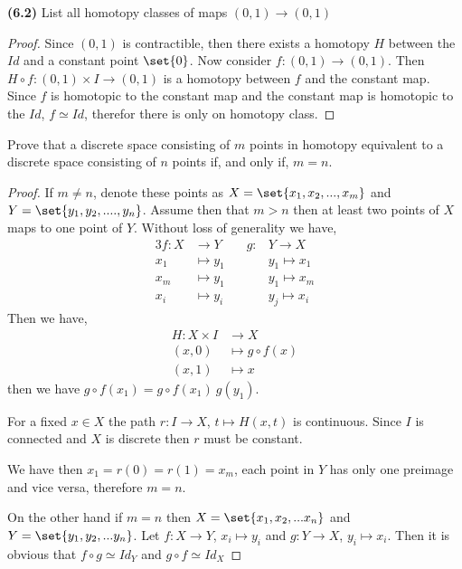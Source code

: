 \documentclass[12pt]{article}
\DeclarePairedDelimiter\set\{\}
\begin{document}
\noindent\textbf{(6.2)} List all homotopy classes of maps $(0, 1) \to (0, 1)$
\begin{proof}
    Since $(0,1)$ is contractible, then there exists a homotopy $H$ between the $Id$ and a constant point $\set{0}$. Now consider $f:(0,1) \to (0,1)$. Then $H\circ f:(0,1)\times I \to (0,1)$ is a homotopy between $f$ and the constant map. Since $f$ is homotopic to the constant map and the constant map is homotopic to the $Id$, $f\simeq  Id$, therefor there is only on homotopy class.
\end{proof}
\newpage
{}
Prove that a discrete space consisting of $m$ points in homotopy equivalent to a discrete space consisting of $n$ points if, and only if, $m=n$.
\begin{proof}
    If $m\neq n$, denote these points as $X = \set{x_1, x_2, ..., x_m}$ and $Y = \set{y_1, y_2, ...., y_n}$. Assume then that $m > n$ then at least two points of $X$ maps to one point of $Y$. Without loss of generality we have,
    \begin{alignat*}{3}
        f: X &\to Y \qquad g:&Y \to X \\
        x_1 &\mapsto y_1 \qquad &y_1 \mapsto x_1 \\
        x_m &\mapsto y_1 \qquad &y_1 \mapsto x_m \\
        x_i &\mapsto y_i \qquad &y_j \mapsto x_i 
    \end{alignat*}
    Then we have,
    \begin{align*}
        H:X\times I &\to X \\
        (x,0) &\mapsto g\circ f(x) \\
        (x,1) &\mapsto x
    \end{align*}
    then we have $g\circ f(x_1) = g\circ f(x_1) \ g(y_1) $.

    For a fixed $x\in X$ the path $r:I\to X$, $t\mapsto H(x,t)$ is continuous. Since $I$ is connected and $X$ is discrete then $r$ must be constant. 

    We have then $x_1 = r(0) = r(1) = x_m$, each point in $Y$ has only one preimage and vice versa, therefore $m = n$.

    On the other hand if $m =n$ then $X = \set{x_1, x_2,...x_n}$ and $Y = \set{y_1, y_2,...y_n}$. Let $f:X\to Y$, $x_i\mapsto y_i$ and $g:Y\to X$, $y_i \mapsto x_i$. Then it is obvious that $f\circ g \simeq Id_Y$ and $g\circ f \simeq Id_X$
        
\end{proof}
\end{document}
